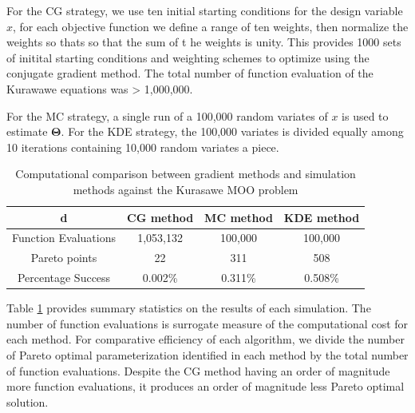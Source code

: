 For the CG strategy, we use ten initial starting conditions for the design variable $x$, for each objective function we define a range of ten weights, then normalize the weights so thats so that the sum of t he weights is unity.  This provides 1000 sets of initital starting conditions and weighting schemes to optimize using the conjugate gradient method.  The total number of function evaluation of the Kurawawe equations was > 1,000,000.

For the MC strategy, a single run of a 100,000 random variates of $x$  is used to estimate $\bm{\Theta}$.  For the KDE strategy, the 100,000 variates is divided equally among 10 iterations containing 10,000 random variates a piece.

\begin{table}[htbp]
	\caption{Computational comparison between gradient methods and simulation methods against the Kurasawe MOO problem}
	\label{tbl:kurasawe}
	\centering
	 \begin{tabular}{cccc}
		 \hline
		 d & CG method & MC method & KDE method \\
		 \hline
		 Function Evaluations & 1,053,132 & 100,000 & 100,000 \\
 		 Pareto points        & 22        & 311     & 508 \\
		 Percentage Success    & 0.002\%   & 0.311\% & 0.508\% \\
		 \hline
	 \end{tabular}
\end{table}

Table \ref{tbl:kurasawe} provides summary statistics on the results of each simulation.  The number of function evaluations is surrogate measure of the computational cost for each method.  For comparative efficiency of each algorithm, we divide the number of Pareto optimal parameterization identified in each method by the total number of function evaluations.  Despite the CG method having an order of magnitude more function evaluations, it produces an order of magnitude less Pareto optimal solution.

